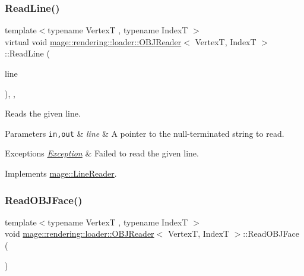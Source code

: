 \subsubsection{\texorpdfstring{Read\+Line()}{ReadLine()}}
{\footnotesize\ttfamily template$<$typename VertexT , typename IndexT $>$ \\
virtual void \mbox{\hyperlink{classmage_1_1rendering_1_1loader_1_1_o_b_j_reader}{mage\+::rendering\+::loader\+::\+O\+B\+J\+Reader}}$<$ VertexT, IndexT $>$\+::Read\+Line (\begin{DoxyParamCaption}\item[{\mbox{\hyperlink{namespacemage_a8769f9d670d6b585ea306cb1062af94b}{Not\+Null}}$<$ \mbox{\hyperlink{namespacemage_a4163ec9a9a27d5e7f4b452dcb99cb2b9}{zstring}} $>$}]{line }\end{DoxyParamCaption})\hspace{0.3cm}{\ttfamily [override]}, {\ttfamily [private]}, {\ttfamily [virtual]}}

Reads the given line.


\begin{DoxyParams}[1]{Parameters}
\mbox{\tt in,out}  & {\em line} & A pointer to the null-\/terminated string to read. \\
\hline
\end{DoxyParams}

\begin{DoxyExceptions}{Exceptions}
{\em \mbox{\hyperlink{classmage_1_1_exception}{Exception}}} & Failed to read the given line. \\
\hline
\end{DoxyExceptions}


Implements \mbox{\hyperlink{classmage_1_1_line_reader_ae50ac0637eddead37a7a9cca2a570072}{mage\+::\+Line\+Reader}}.

\mbox{\label{classmage_1_1rendering_1_1loader_1_1_o_b_j_reader_a58d5c4e4a5a82714567413b6e17a9ec7}} 
\subsubsection{\texorpdfstring{Read\+O\+B\+J\+Face()}{ReadOBJFace()}}
{\footnotesize\ttfamily template$<$typename VertexT , typename IndexT $>$ \\
void \mbox{\hyperlink{classmage_1_1rendering_1_1loader_1_1_o_b_j_reader}{mage\+::rendering\+::loader\+::\+O\+B\+J\+Reader}}$<$ VertexT, IndexT $>$\+::Read\+O\+B\+J\+Face (\begin{DoxyParamCaption}{ }\end{DoxyParamCaption})\hspace{0.3cm}{\ttfamily [private]}}


